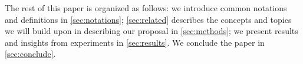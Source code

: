 The rest of this paper is organized as follows: we introduce common notations and definitions in \autoref{sec:notations}; \autoref{sec:related} describes the concepts and topics we will build upon in describing our proposal in \autoref{sec:methods}; we present results and insights from experiments in \autoref{sec:results}. We  conclude the paper in \autoref{sec:conclude}.  %
